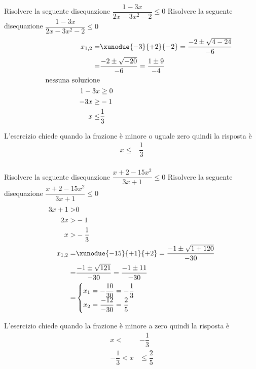 \begin{exercise}
		Risolvere la seguente disequazione $\dfrac{1-3x}{2x-3x^2-2}\leq 0$
	\tcblower
	Risolvere la seguente disequazione $\dfrac{1-3x}{2x-3x^2-2}\leq 0$
	\begin{align*}
	x_{1,2}=&\xunodue{-3}{+2}{-2}=\dfrac{-2\pm\sqrt{4-24}}{-6}\\
	=&\dfrac{-2\pm\sqrt{-20}}{-6}=\dfrac{1\pm 9}{-4}\\
\qquad\text{nessuna soluzione}\\
		1-3x&\geq0\\
	-3x\geq&-1\\
	x\leq&\dfrac{1}{3}\\
	\end{align*}
	\begin{center}
		
	\end{center}
	L'esercizio chiede quando la frazione è minore o uguale zero quindi la risposta è 
	\begin{align*}
	 x\leq&\dfrac{1}{3}\\
	\end{align*}
\end{exercise}
\begin{exercise}
		Risolvere la seguente disequazione $\dfrac{x+2-15x^2}{3x+1}\leq0$
	\tcblower
	Risolvere la seguente disequazione $\dfrac{x+2-15x^2}{3x+1}\leq0$
	\begin{align*}
	3x+1>&0\\
	2x>&-1\\
	x>&-\dfrac{1}{3}\\
	x_{1,2}=&\xunodue{-15}{+1}{+2}=\dfrac{-1\pm\sqrt{1+120}}{-30}\\
	=&\dfrac{-1\pm\sqrt{121}}{-30}=\dfrac{-1\pm 11}{-30}\\
	=&\begin{cases}
	x_1=-\dfrac{10}{30}=-\dfrac{1}{3}\\
	x_2=\dfrac{-12}{-30}=\dfrac{2}{5}
	\end{cases}\\
	\end{align*}
	\begin{center}
		
	\end{center}
	L'esercizio chiede quando la frazione è minore a zero quindi la risposta è 
	\begin{align*}
	x<&-\dfrac{1}{3}\\
	-\dfrac{1}{3}<x&\leq \dfrac{2}{5}\\ 
	\end{align*}
\end{exercise}
